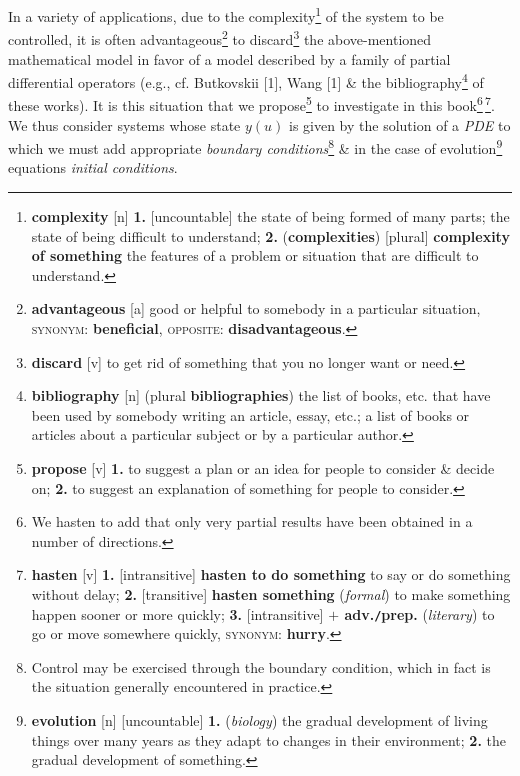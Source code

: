 \documentclass[oneside]{book}
\numberwithin{equation}{section}
\begin{document}
In a variety of applications, due to the complexity\footnote{\textbf{complexity} [n] \textbf{1.} [uncountable] the state of being formed of many parts; the state of being difficult to understand; \textbf{2.} (\textbf{complexities}) [plural] \textbf{complexity of something} the features of a problem or situation that are difficult to understand.} of the system to be controlled, it is often advantageous\footnote{\textbf{advantageous} [a] good or helpful to somebody in a particular situation, \textsc{synonym}: \textbf{beneficial}, \textsc{opposite}: \textbf{disadvantageous}.} to discard\footnote{\textbf{discard} [v] to get rid of something that you no longer want or need.} the above-mentioned mathematical model in favor of a model described by a family of partial differential operators (e.g., cf. Butkovskii [1], Wang [1] \& the bibliography\footnote{\textbf{bibliography} [n] (plural \textbf{bibliographies}) the list of books, etc. that have been used by somebody writing an article, essay, etc.; a list of books or articles about a particular subject or by a particular author.} of these works). It is this situation that we propose\footnote{\textbf{propose} [v] \textbf{1.} to suggest a plan or an idea for people to consider \& decide on; \textbf{2.} to suggest an explanation of something for people to consider.} to investigate in this book\footnote{We hasten to add that only very partial results have been obtained in a number of directions.}\,\footnote{\textbf{hasten} [v] \textbf{1.} [intransitive] \textbf{hasten to do something} to say or do something without delay; \textbf{2.} [transitive] \textbf{hasten something} (\textit{formal}) to make something happen sooner or more quickly; \textbf{3.} [intransitive] \textbf{$+$ adv.\texttt{/}prep.} (\textit{literary}) to go or move somewhere quickly, \textsc{synonym}: \textbf{hurry}.}. We thus consider systems whose state $y(u)$ is given by the solution of a \textit{PDE} to which we must add appropriate \textit{boundary conditions}\footnote{Control may be exercised through the boundary condition, which in fact is the situation generally encountered in practice.} \& in the case of evolution\footnote{\textbf{evolution} [n] [uncountable] \textbf{1.} (\textit{biology}) the gradual development of living things over many years as they adapt to changes in their environment; \textbf{2.} the gradual development of something.} equations \textit{initial conditions}.
\end{document}
